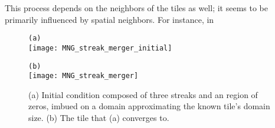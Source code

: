 This process depends on the neighbors of the tiles as well; it seems to be primarily
influenced by spatial neighbors. For instance, in


\begin{figure}
\begin{minipage}[height=.05\textheight]{.5\textwidth}
\centering
\small{\texttt{(a)}} \\
\texttt{[image: MNG\_streak\_merger\_initial]}
\end{minipage}
\begin{minipage}[height=.2\textheight]{.5\textwidth}
\centering
\small{\texttt{(b)}} \\
\texttt{[image: MNG\_streak\_merger]}
\end{minipage}
\caption{ \label{fig:streakmerger}
(a) Initial condition composed of three streaks and an region of zeros,
imbued on a {\spt} domain approximating the known tile's domain size.
(b) The tile that (a) converges to.
}
\end{figure}

